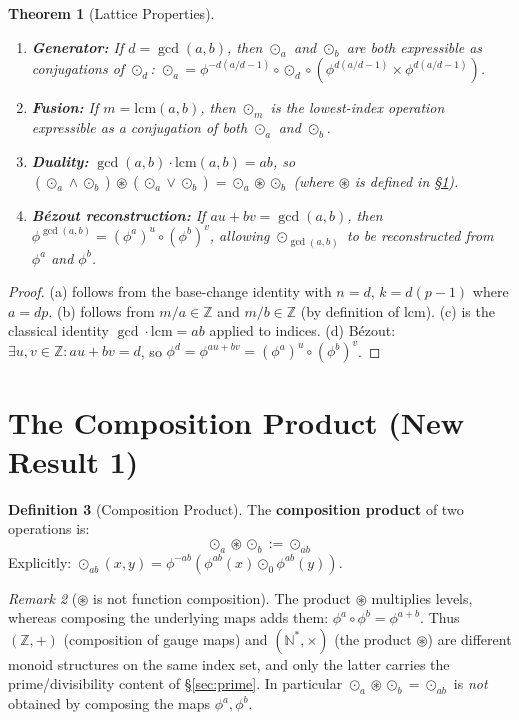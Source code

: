 \documentclass[11pt,twocolumn]{article}
\theoremstyle{plain}
\newtheorem{theorem}{Theorem}
\theoremstyle{definition}
\newtheorem{definition}[theorem]{Definition}
\theoremstyle{remark}
\newtheorem{remark}[theorem]{Remark}
\newcommand{\N}{\mathbb{N}}
\newcommand{\Z}{\mathbb{Z}}
\begin{document}
\begin{theorem}[Lattice Properties]\label{thm:lattice}
\begin{enumerate}[label=(\alph*)]
    \item \textbf{Generator:} If $d = \gcd(a,b)$, then $\odot_a$ and $\odot_b$ are both expressible as conjugations of $\odot_d$: $\odot_a = \phi^{-d(a/d - 1)} \circ \odot_d \circ (\phi^{d(a/d-1)} \times \phi^{d(a/d-1)})$.
    \item \textbf{Fusion:} If $m = \mathrm{lcm}(a,b)$, then $\odot_m$ is the lowest-index operation expressible as a conjugation of both $\odot_a$ and $\odot_b$.
    \item \textbf{Duality:} $\gcd(a,b) \cdot \mathrm{lcm}(a,b) = ab$, so $(\odot_a \wedge \odot_b) \circledast (\odot_a \vee \odot_b) = \odot_a \circledast \odot_b$ (where $\circledast$ is defined in \S\ref{sec:composition}).
    \item \textbf{B\'ezout reconstruction:} If $au + bv = \gcd(a,b)$, then $\phi^{\gcd(a,b)} = (\phi^a)^u \circ (\phi^b)^v$, allowing $\odot_{\gcd(a,b)}$ to be reconstructed from $\phi^a$ and $\phi^b$.
\end{enumerate}
\end{theorem}

\begin{proof}
(a) follows from the base-change identity with $n = d$, $k = d(p-1)$ where $a = dp$.
(b) follows from $m/a \in \Z$ and $m/b \in \Z$ (by definition of lcm).
(c) is the classical identity $\gcd \cdot \mathrm{lcm} = ab$ applied to indices.
(d) B\'ezout: $\exists u,v \in \Z: au + bv = d$, so $\phi^d = \phi^{au+bv} = (\phi^a)^u \circ (\phi^b)^v$.
\end{proof}


\section{The Composition Product (New Result 1)}
\label{sec:composition}

\begin{definition}[Composition Product]\label{def:circledast}
The \textbf{composition product} of two operations is:
\begin{equation}
\boxed{\odot_a \circledast \odot_b := \odot_{ab}}
\end{equation}
Explicitly: $\odot_{ab}(x,y) = \phi^{-ab}(\phi^{ab}(x) \odot_0 \phi^{ab}(y))$.

\begin{remark}[$\circledast$ is not function composition]\label{rem:two-monoids}
The product $\circledast$ multiplies levels, whereas composing the underlying maps adds them: $\phi^a\circ\phi^b=\phi^{a+b}$. Thus $(\Z,+)$ (composition of gauge maps) and $(\N^*,\times)$ (the product $\circledast$) are different monoid structures on the same index set, and only the latter carries the prime/divisibility content of \S\ref{sec:prime}. In particular $\odot_a\circledast\odot_b=\odot_{ab}$ is \emph{not} obtained by composing the maps $\phi^a,\phi^b$.
\end{remark}
\end{definition}
\end{document}
